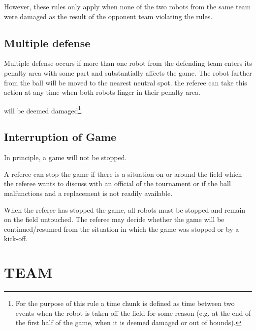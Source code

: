 \documentclass{article}
\begin{document}
However, these rules only apply when none of the two robots from the same team
were damaged as the result of the opponent team violating the rules.

\subsection{Multiple defense \label{ref-013}}

Multiple defense occurs if more than one robot from the defending team enters
its penalty area with some part and substantially affects the game. The robot
farther from the ball will be moved to the nearest neutral spot.
 the referee can take this action at any time when both
robots linger in their penalty area.

will be deemed damaged\footnote{For the purpose of this rule a time chunk is
defined as time between two events when the robot is taken off the field for
some reason (e.g. at the end of the first half of the game, when it is deemed
damaged or out of bounds).}.

\subsection{Interruption of Game \label{ref-014}}

In principle, a game will not be stopped.

A referee can stop the game if there is a situation on or around the field
which the referee wants to discuss with an official of the tournament or if the
ball malfunctions and a replacement is not readily available.

When the referee has stopped the game, all robots must be stopped and remain on
the field untouched. The referee may decide whether the game will be
continued/resumed from the situation in which the game was stopped or by a
kick-off.

\section{TEAM \label{ref-015}}
\end{document}

